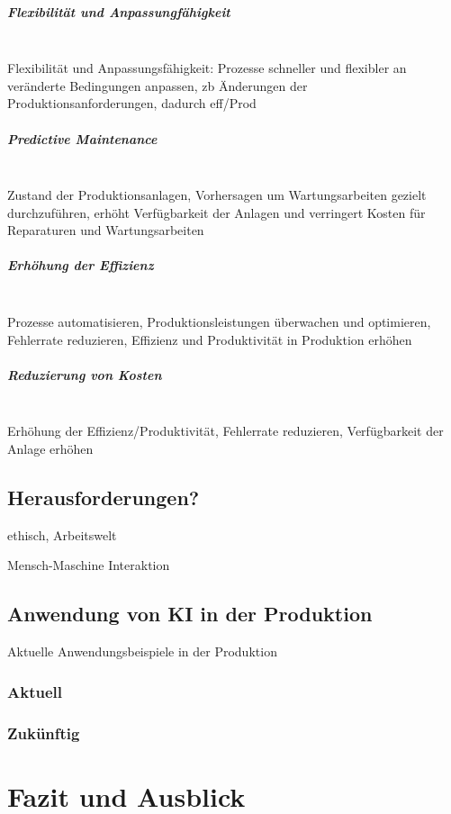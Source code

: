 \documentclass[a4paper,12pt, german]{report}
\begin{document}
\paragraph{Flexibilität und Anpassungfähigkeit} $ $ \\ 
Flexibilität und Anpassungsfähigkeit: Prozesse schneller und flexibler an veränderte Bedingungen anpassen, zb Änderungen der Produktionsanforderungen, dadurch eff/Prod

\paragraph{Predictive Maintenance} $ $ \\ 
Zustand der Produktionsanlagen, Vorhersagen um Wartungsarbeiten gezielt durchzuführen, erhöht Verfügbarkeit der Anlagen und verringert Kosten für Reparaturen und Wartungsarbeiten

\paragraph{Erhöhung der Effizienz} $ $ \\ 
Prozesse automatisieren, Produktionsleistungen überwachen und optimieren, Fehlerrate reduzieren, Effizienz und Produktivität in Produktion erhöhen

\paragraph{Reduzierung von Kosten} $ $ \\ 
Erhöhung der Effizienz/Produktivität, Fehlerrate reduzieren, Verfügbarkeit der Anlage erhöhen

\section{Herausforderungen?}
ethisch, Arbeitswelt

Mensch-Maschine Interaktion

\section{Anwendung von KI in der Produktion}
Aktuelle Anwendungsbeispiele in der Produktion
\subsection{Aktuell}
\subsection{Zukünftig}


\chapter{Fazit und Ausblick}

\listoffigures

\clearpage




\appendix
\end{document}
